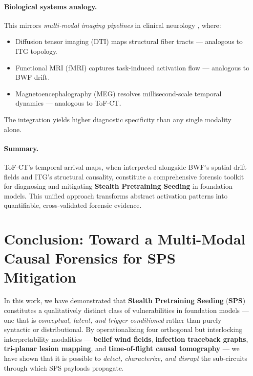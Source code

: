 \documentclass[11pt]{article}
\begin{document}
\paragraph{Biological systems analogy.}  
This mirrors \emph{multi-modal imaging pipelines} in clinical neurology \citep{friston2009modalities}, where:
\begin{itemize}
    \item Diffusion tensor imaging (DTI) maps structural fiber tracts — analogous to ITG topology.
    \item Functional MRI (fMRI) captures task-induced activation flow — analogous to BWF drift.
    \item Magnetoencephalography (MEG) resolves millisecond-scale temporal dynamics — analogous to ToF-CT.
\end{itemize}
The integration yields higher diagnostic specificity than any single modality alone.

\paragraph{Summary.}  
ToF-CT’s temporal arrival maps, when interpreted alongside BWF’s spatial drift fields and ITG’s structural causality, constitute a comprehensive forensic toolkit for diagnosing and mitigating \textbf{Stealth Pretraining Seeding} in foundation models.  
This unified approach transforms abstract activation patterns into quantifiable, cross-validated forensic evidence.






%

% 




\section{Conclusion: Toward a Multi-Modal Causal Forensics for SPS Mitigation}

In this work, we have demonstrated that \textbf{Stealth Pretraining Seeding} (\textbf{SPS}) constitutes a qualitatively distinct class of vulnerabilities in foundation models — one that is \emph{conceptual, latent, and trigger-conditioned} rather than purely syntactic or distributional. By operationalizing four orthogonal but interlocking interpretability modalities — \textbf{belief wind fields}, \textbf{infection traceback graphs}, \textbf{tri-planar lesion mapping}, and \textbf{time-of-flight causal tomography} — we have shown that it is possible to \emph{detect, characterize, and disrupt} the sub-circuits through which SPS payloads propagate.
\end{document}
